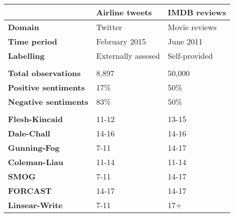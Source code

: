 \begin{tabular}{|l|l|l|} \cline{2-3}
\multicolumn{1}{c|}{} & \textbf{Airline tweets} & \textbf{IMDB reviews} \\ \hline
\textbf{Domain} & Twitter & Movie reviews \\ \hline
\textbf{Time period} & February 2015 & June 2011 \\ \hline
\textbf{Labelling} & Externally assesed & Self-provided\\ \hline
 \multicolumn{3}{c}{} \\ [-1.5ex] \hline
\textbf{Total observations} & 8,897 & 50,000 \\ \hline
\textbf{Positive sentiments} & 17\% & 50\% \\ \hline
\textbf{Negative sentiments} & 83\% & 50\%\\ \hline
 \multicolumn{3}{c}{} \\ [-1.5ex] \hline
\textbf{Flesh-Kincaid} & 11-12 & 13-15 \\ \hline
\textbf{Dale-Chall} & 14-16 & 14-16 \\ \hline
\textbf{Gunning-Fog} & 7-11 & 14-17 \\ \hline
\textbf{Coleman-Liau} & 11-14 & 11-14 \\ \hline
\textbf{SMOG} & 7-11 & 14-17 \\ \hline
\textbf{FORCAST} & 14-17 & 14-17 \\ \hline
\textbf{Linsear-Write} & 7-11 & 17+ \\ \hline
\end{tabular}